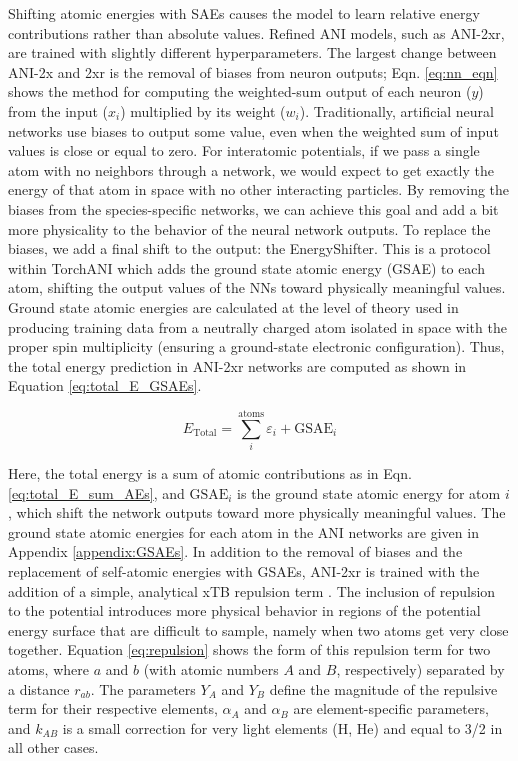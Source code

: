Shifting atomic energies with SAEs causes the model to learn relative energy contributions rather than absolute values. 
Refined ANI models, such as ANI-2xr, are trained with slightly different hyperparameters.
The largest change between ANI-2x and 2xr is the removal of biases from neuron outputs; Eqn. \ref{eq:nn_eqn} shows the method for computing the weighted-sum output of each neuron ($y$) from the input ($x_i$) multiplied by its weight ($w_i$).
Traditionally, artificial neural networks use biases to output some value, even when the weighted sum of input values is close or equal to zero.
For interatomic potentials, if we pass a single atom with no neighbors through a network, we would expect to get exactly the energy of that atom in space with no other interacting particles.
By removing the biases from the species-specific networks, we can achieve this goal and add a bit more physicality to the behavior of the neural network outputs.
To replace the biases, we add a final shift to the output: the EnergyShifter.
This is a protocol within TorchANI which adds the ground state atomic energy (GSAE) to each atom, shifting the output values of the NNs toward physically meaningful values.
Ground state atomic energies are calculated at the level of theory used in producing training data from a neutrally charged atom isolated in space with the proper spin multiplicity (ensuring a ground-state electronic configuration).
Thus, the total energy prediction in ANI-2xr networks are computed as shown in Equation \ref{eq:total_E_GSAEs}.

\begin{equation}
    E_{\text{Total}} = \sum_{i}^{\text{atoms}} \varepsilon_i + \text{GSAE}_i
    \label{eq:total_E_GSAEs}
\end{equation}

Here, the total energy is a sum of atomic contributions as in Eqn. \ref{eq:total_E_sum_AEs}, and $\text{GSAE}_i$ is the ground state atomic energy for atom $i$, which shift the network outputs toward more physically meaningful values.
The ground state atomic energies for each atom in the ANI networks are given in Appendix \ref{appendix:GSAEs}.
In addition to the removal of biases and the replacement of self-atomic energies with GSAEs, ANI-2xr is trained with the addition of a simple, analytical xTB repulsion term \cite{xtb_repulsion}.
The inclusion of repulsion to the potential introduces more physical behavior in regions of the potential energy surface that are difficult to sample, namely when two atoms get very close together.
Equation \ref{eq:repulsion} shows the form of this repulsion term for two atoms, where $a$ and $b$ (with atomic numbers $A$ and $B$, respectively) separated by a distance $r_{ab}$. 
The parameters $Y_A$ and $Y_B$ define the magnitude of the repulsive term for their respective elements, $\alpha_{A}$ and $\alpha_{B}$ are element-specific parameters, and $k_{AB}$ is a small correction for very light elements (H, He) and equal to 3/2 in all other cases.

